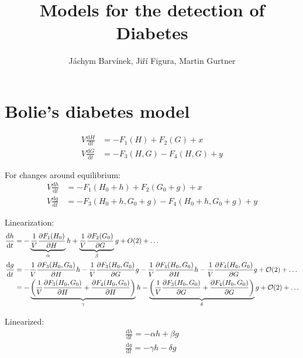 \documentclass{article}
\providecommand{\m}[1]{\ensuremath{\mathrm{#1}}}
\providecommand{\p}[1]{\ensuremath{\partial #1}}
\begin{document}
\title{Models for the detection of Diabetes}
\author{J\'achym Barv\'inek, Ji\v r\'i Figura, Martin Gurtner}

\maketitle

\section{Bolie's diabetes model}

\begin{align}
V\frac{\m{d} H}{\m{d} t}&=-F_1(H)+F_2(G)+ x\\
V\frac{\m{d} G}{\m{d} t}&=-F_3(H,G)-F_4(H,G) + y 
\end{align}

For changes around equilibrium:
\begin{align}
V\frac{\m{d}h}{\m{d}t}&=-F_1(H_0+h)+F_2(G_0+g)+ x\\
V\frac{\m{d}g}{\m{d}t}&=-F_3(H_0+h,G_0+g)-F_4(H_0+h,G_0+g)+ y
\end{align}

Linearization:
\begin{align}
\frac{\m{d}h}{\m{d}t}&=-\underbrace{%
		\frac{1}{V}\frac{\p F_1(H_0)}{\p H}}_{\alpha}h+%
%
\underbrace{%
		\frac{1}{V}\frac{\p F_2(G_0)}{\p G}}_{\beta}g+O(2)+\dots \\%
%
\frac{\m{d}g}{\m{d}t}&=-\frac{1}{V}\frac{\p F_3(H_0, G_0)}{\p H}h- \frac{1}{V}\frac{\p F_3(H_0, G_0)}{\p G}g-\frac{1}{V}\frac{\p F_4(H_0, G_0)}{\p H}h-\frac{1}{V}\frac{\p F_4(H_0, G_0)}{\p G}g+\mathcal{O}(2)+\dots\\%
%
&=-\underbrace{%
\left(\frac{1}{V}\frac{\p F_3(H_0, G_0)}{\p H}+\frac{\p F_4(H_0, G_0)}{\p H}\right)}_{\gamma}h%
-\underbrace{%
\left(\frac{1}{V}\frac{\p F_3(H_0, G_0)}{\p G}+\frac{\p F_4(H_0, G_0)}{\p G}\right)}_{\delta} g+\mathcal{O}(2)+\dots
\end{align}

Linearized:
\begin{align*}
\frac{\m{d}h}{\m{d}t}=-\alpha h + \beta g\\
\frac{\m{d}g}{\m{d}t}=-\gamma h - \delta g\\
\end{align*}
\end{document}
